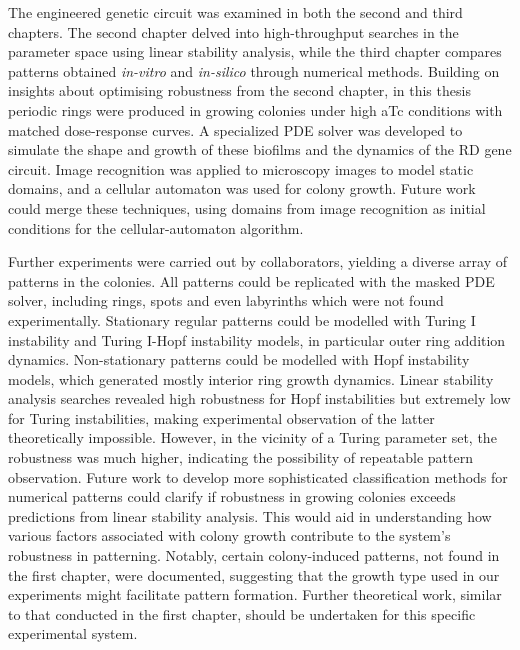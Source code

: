 The engineered genetic circuit was examined in both the second and third chapters.
The second chapter delved into high-throughput searches in the parameter space using linear stability analysis, while the third chapter compares patterns obtained \textit{in-vitro} and \textit{in-silico} through numerical methods.
Building on insights about optimising robustness from the second chapter, in this thesis periodic rings were produced in growing colonies under high aTc conditions with matched dose-response curves.
A specialized PDE solver was developed to simulate the shape and growth of these biofilms and the dynamics of the RD gene circuit.
Image recognition was applied to microscopy images to model static domains, and a cellular automaton was used for colony growth.
Future work could merge these techniques, using domains from image recognition as initial conditions for the cellular-automaton algorithm.

Further experiments were carried out by collaborators, yielding a diverse array of patterns in the colonies.
All patterns could be replicated with the masked PDE solver, including rings, spots and even labyrinths which were not found experimentally.
Stationary regular patterns could be modelled with Turing I instability and Turing I-Hopf instability models, in particular outer ring addition dynamics.
Non-stationary patterns could be modelled with Hopf instability models, which generated mostly interior ring growth dynamics.
Linear stability analysis searches revealed high robustness for Hopf instabilities but extremely low for Turing instabilities, making experimental observation of the latter theoretically impossible.
However, in the vicinity of a Turing parameter set, the robustness was much higher, indicating the possibility of repeatable pattern observation.
Future work to develop more sophisticated classification methods for numerical patterns could clarify if robustness in growing colonies exceeds predictions from linear stability analysis.
This would aid in understanding how various factors associated with colony growth contribute to the system's robustness in patterning.
Notably, certain colony-induced patterns, not found in the first chapter, were documented, suggesting that the growth type used in our experiments might facilitate pattern formation.
Further theoretical work, similar to that conducted in the first chapter, should be undertaken for this specific experimental system.


